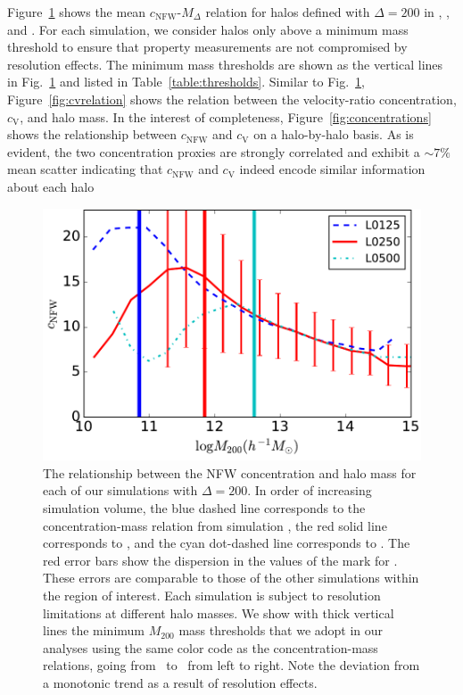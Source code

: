 \documentclass[usenatbib]{mnras}
\begin{document}
Figure~\ref{fig:cnfwrelation} shows the mean $c_{\mathrm{NFW}}$-$M_{\Delta}$ relation for halos defined with
$\Delta=200$ in \simA, \simB, and \simC. For each simulation, we consider halos only above a minimum mass threshold 
to ensure that property measurements are not compromised by resolution effects. The minimum mass 
thresholds are shown as the vertical lines in Fig.~\ref{fig:cnfwrelation} and listed in Table~\ref{table:thresholds}. 
Similar to Fig.~\ref{fig:cnfwrelation}, Figure~\ref{fig:cvrelation} shows the relation between the velocity-ratio concentration, $c_{\mathrm{V}}$, and halo mass. In the interest of completeness, Figure~\ref{fig:concentrations} shows the relationship 
between $c_{\mathrm{NFW}}$ and $c_{\mathrm{V}}$ on a halo-by-halo basis. As is evident, the two concentration 
proxies are strongly correlated and exhibit a $\sim 7\%$ mean scatter indicating that $c_{\mathrm{NFW}}$ and $c_{\mathrm{V}}$ 
indeed encode similar information about each halo 

\begin{figure}
\centering
\includegraphics[width=.5\textwidth]{masscut_cNFW_d200.pdf}
\caption{The relationship between the NFW concentration and halo mass for each of our simulations with $\Delta =200$. 
In order of increasing simulation volume, the blue dashed line corresponds to the concentration-mass relation from simulation 
\simA, the red solid line corresponds to \simB, and the cyan dot-dashed line corresponds to \simC. The red error bars show the
dispersion in the values of the mark for \simB. These errors are comparable to those of the other simulations
within the region of interest.
Each simulation is subject to resolution limitations at different halo masses. We show with thick vertical lines 
the minimum $M_{200}$ mass thresholds that we adopt in our analyses using the same color code as 
the concentration-mass relations, going from \simA \ to \simC \ from left to right. Note the deviation from a monotonic trend as a result of resolution effects.}
\label{fig:cnfwrelation}
\end{figure}
\end{document}
